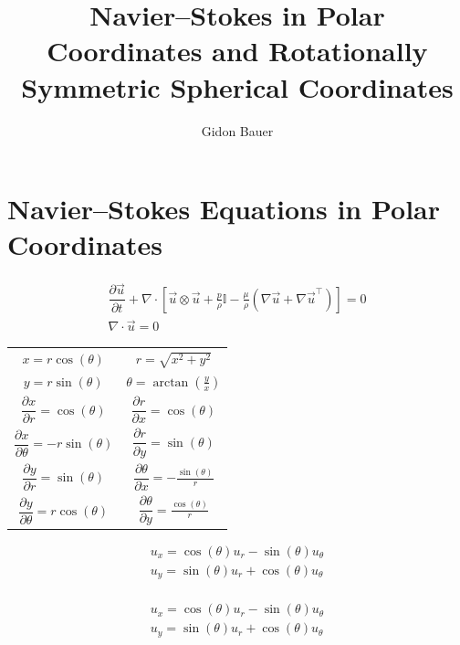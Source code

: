 \documentclass{article}
\title{Navier--Stokes in Polar Coordinates and Rotationally Symmetric Spherical Coordinates}
\author{Gidon Bauer}
\numberwithin{equation}{section}
\newcommand{\pd}[2]{\dfrac{\partial #1}{\partial #2}}
\renewcommand{\div}{\nabla \cdot}
\begin{document}


\maketitle

\section{Navier--Stokes Equations in Polar Coordinates}

\begin{gather}
    \pd{\vec{u}}{t} + \div \left[
        \vec{u} \otimes \vec{u} +
        \frac{p}{\rho} \mathbb{I} -
        \frac{\mu}{\rho} \left(\nabla \vec{u} + \nabla \vec{u}^{\top}\right)
    \right] = 0 \\
    \div \vec{u} = 0
\end{gather}

\begin{center}
    \def\arraystretch{2}
    \begin{tabular}[]{|c|c|}
        \hline
        $x = r \cos(\theta)$ & $r = \sqrt{x^2 + y^2}$ \\
        $y = r \sin(\theta)$ & $\theta = \arctan\left(\frac{y}{x}\right)$ \\
        \hline
        \hline
        $\pd{x}{r} = \cos(\theta)$         & $\pd{r}{x} = \cos(\theta)$ \\
        $\pd{x}{\theta} = -r \sin(\theta)$ & $\pd{r}{y} = \sin(\theta)$ \\
        $\pd{y}{r} = \sin(\theta)$         & $\pd{\theta}{x} = -\frac{\sin(\theta)}{r}$ \\
        $\pd{y}{\theta} = r \cos(\theta)$  & $\pd{\theta}{y} = \frac{\cos(\theta)}{r}$ \\
        \hline
    \end{tabular}
\end{center}

\begin{align*}
        u_x = \cos(\theta) u_r - \sin(\theta) u_\theta \\
        u_y = \sin(\theta) u_r + \cos(\theta) u_\theta \\
\end{align*}

\begin{align*}
        u_x = \cos(\theta) u_r - \sin(\theta) u_\theta \\
        u_y = \sin(\theta) u_r + \cos(\theta) u_\theta \\
\end{align*}
\end{document}
